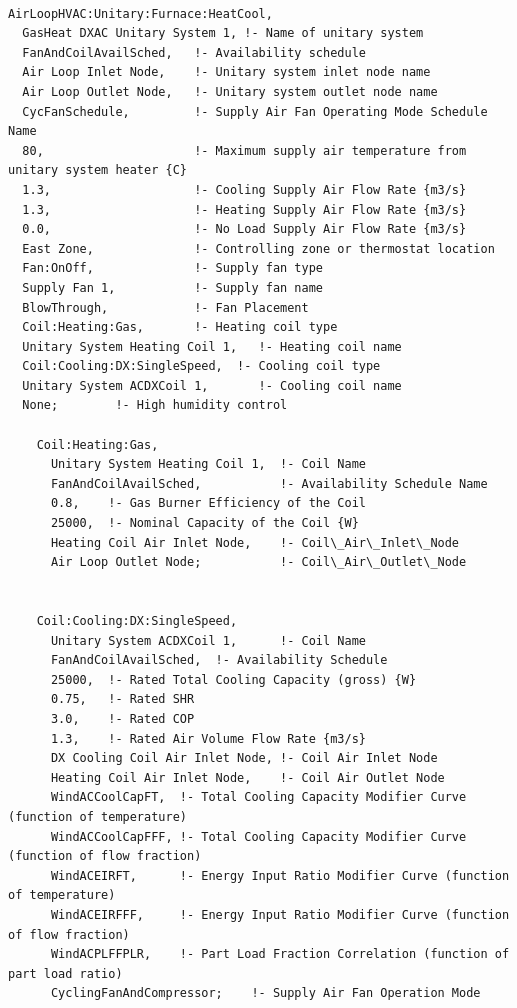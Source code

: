 \begin{lstlisting}

AirLoopHVAC:Unitary:Furnace:HeatCool,
  GasHeat DXAC Unitary System 1, !- Name of unitary system
  FanAndCoilAvailSched,   !- Availability schedule
  Air Loop Inlet Node,    !- Unitary system inlet node name
  Air Loop Outlet Node,   !- Unitary system outlet node name
  CycFanSchedule,         !- Supply Air Fan Operating Mode Schedule Name
  80,                     !- Maximum supply air temperature from unitary system heater {C}
  1.3,                    !- Cooling Supply Air Flow Rate {m3/s}
  1.3,                    !- Heating Supply Air Flow Rate {m3/s}
  0.0,                    !- No Load Supply Air Flow Rate {m3/s}
  East Zone,              !- Controlling zone or thermostat location
  Fan:OnOff,              !- Supply fan type
  Supply Fan 1,           !- Supply fan name
  BlowThrough,            !- Fan Placement
  Coil:Heating:Gas,       !- Heating coil type
  Unitary System Heating Coil 1,   !- Heating coil name
  Coil:Cooling:DX:SingleSpeed,  !- Cooling coil type
  Unitary System ACDXCoil 1,       !- Cooling coil name
  None;        !- High humidity control

    Coil:Heating:Gas,
      Unitary System Heating Coil 1,  !- Coil Name
      FanAndCoilAvailSched,           !- Availability Schedule Name
      0.8,    !- Gas Burner Efficiency of the Coil
      25000,  !- Nominal Capacity of the Coil {W}
      Heating Coil Air Inlet Node,    !- Coil\_Air\_Inlet\_Node
      Air Loop Outlet Node;           !- Coil\_Air\_Outlet\_Node


    Coil:Cooling:DX:SingleSpeed,
      Unitary System ACDXCoil 1,      !- Coil Name
      FanAndCoilAvailSched,  !- Availability Schedule
      25000,  !- Rated Total Cooling Capacity (gross) {W}
      0.75,   !- Rated SHR
      3.0,    !- Rated COP
      1.3,    !- Rated Air Volume Flow Rate {m3/s}
      DX Cooling Coil Air Inlet Node, !- Coil Air Inlet Node
      Heating Coil Air Inlet Node,    !- Coil Air Outlet Node
      WindACCoolCapFT,  !- Total Cooling Capacity Modifier Curve (function of temperature)
      WindACCoolCapFFF, !- Total Cooling Capacity Modifier Curve (function of flow fraction)
      WindACEIRFT,      !- Energy Input Ratio Modifier Curve (function of temperature)
      WindACEIRFFF,     !- Energy Input Ratio Modifier Curve (function of flow fraction)
      WindACPLFFPLR,    !- Part Load Fraction Correlation (function of part load ratio)
      CyclingFanAndCompressor;    !- Supply Air Fan Operation Mode



\end{lstlisting}
